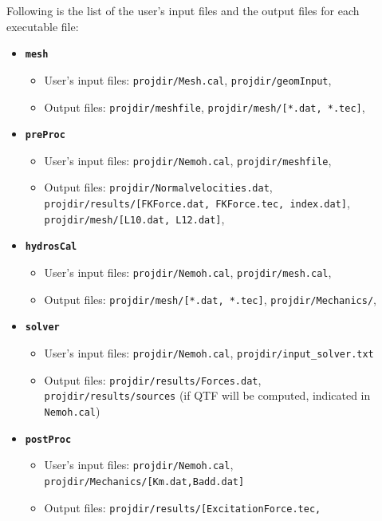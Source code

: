 \documentclass[12pt,a4paper,titlepage]{article}
\begin{document}
Following is the list of the user's input files and the output files for each executable file:
\begin{itemize}
\item \texttt{\textbf{mesh}}
\begin{itemize}
\item User's input files: \texttt{projdir/Mesh.cal}, \texttt{projdir/geomInput},
\item Output files: \texttt{projdir/meshfile}, \texttt{projdir/mesh/[*.dat, *.tec]},
\end{itemize}
\item \texttt{\textbf{preProc}}
\begin{itemize}
\item User's input files: \texttt{projdir/Nemoh.cal}, \texttt{projdir/meshfile},
\item Output files: \texttt{projdir/Normalvelocities.dat}, \\
  \hspace{2cm} \texttt{projdir/results/[FKForce.dat, FKForce.tec, index.dat]}, \\
  \hspace{2cm} \texttt{projdir/mesh/[L10.dat, L12.dat]},
\end{itemize}
\item \texttt{\textbf{hydrosCal}}
\begin{itemize}
\item User's input files: \texttt{projdir/Nemoh.cal}, \texttt{projdir/mesh.cal},
\item Output files: \texttt{projdir/mesh/[*.dat, *.tec]}, \texttt{projdir/Mechanics/},
\end{itemize}
\item \texttt{\textbf{solver}}
\begin{itemize}
\item User's input files: \texttt{projdir/Nemoh.cal}, \texttt{projdir/input\_solver.txt}
\item Output files: \texttt{projdir/results/Forces.dat},\\
\texttt{projdir/results/sources} (if QTF will be computed, indicated in \texttt{Nemoh.cal})
\end{itemize}
\item \texttt{\textbf{postProc}}
\begin{itemize}
\item User's input files: \texttt{projdir/Nemoh.cal}, \\ \texttt{projdir/Mechanics/[Km.dat,Badd.dat]}
\item Output files: \texttt{projdir/results/[ExcitationForce.tec,}\\

\end{itemize}
\end{itemize}
\end{document}
